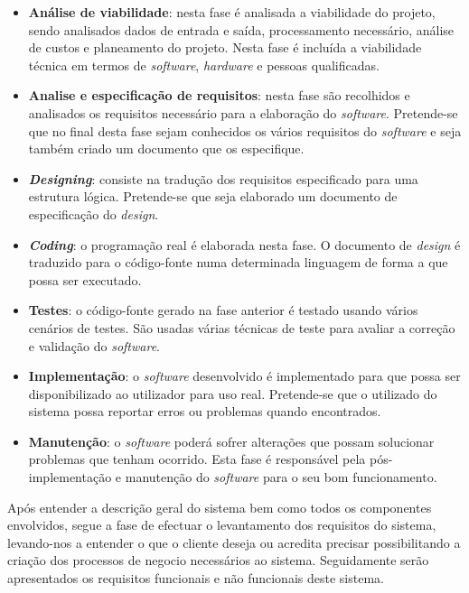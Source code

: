 \begin{itemize}
	\item \textbf{Análise de viabilidade}: nesta fase é analisada a viabilidade do projeto, sendo analisados dados de entrada e saída, processamento necessário, análise de custos e planeamento do projeto. Nesta fase é incluída a viabilidade técnica em termos de \textit{software}, \textit{hardware} e pessoas qualificadas. 
	
	\item \textbf{Analise e especificação de requisitos}: nesta fase são recolhidos e analisados os requisitos necessário para a elaboração do \textit{software}. Pretende-se que no final desta fase sejam conhecidos os vários requisitos do \textit{software} e seja também criado um documento que os especifique. 
	
	\item  \textbf{\textit{Designing}}: consiste na tradução dos requisitos especificado para uma estrutura lógica. Pretende-se que seja elaborado um documento de especificação do \textit{design}. 
	
	
	\item  \textbf{\textit{Coding}}: o programação real é elaborada nesta fase. O documento de \textit{design} é traduzido para o código-fonte numa determinada linguagem de forma a que possa ser executado. 
	
	\item \textbf{Testes}: o código-fonte gerado na fase anterior é testado usando vários cenários de testes. São usadas várias técnicas de teste para avaliar a correção e validação do \textit{software}. 
	
	\item  \textbf{Implementação}: o \textit{software} desenvolvido é implementado para que possa ser disponibilizado ao utilizador para uso real. Pretende-se que o utilizado do sistema possa reportar erros ou problemas quando encontrados. 
	
	\item  \textbf{Manutenção}: o \textit{software} poderá sofrer alterações que possam solucionar problemas que tenham ocorrido. Esta fase é responsável pela pós-implementação e manutenção do \textit{software} para o seu bom funcionamento.
	
\end{itemize}


Após entender a descrição geral do sistema bem como todos os componentes envolvidos, segue a fase de efectuar o levantamento dos requisitos do sistema, levando-nos a entender o que o cliente deseja ou acredita precisar possibilitando a criação dos processos de negocio necessários ao sistema. Seguidamente serão apresentados os requisitos funcionais e não funcionais deste sistema. 


